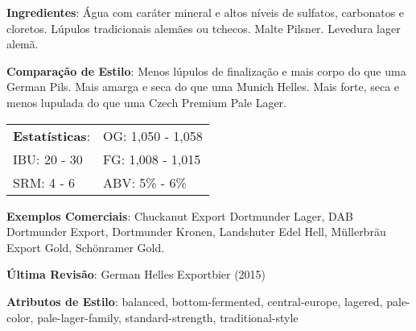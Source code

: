 \textbf{Ingredientes}: Água com caráter mineral e altos níveis de sulfatos, carbonatos e cloretos. Lúpulos tradicionais alemães ou tchecos. Malte Pilsner. Levedura lager alemã.

\textbf{Comparação de Estilo}: Menos lúpulos de finalização e mais corpo do que uma German Pils. Mais amarga e seca do que uma Munich Helles. Mais forte, seca e menos lupulada do que uma Czech Premium Pale Lager.

\begin{tabular}{@{}p{35mm}p{35mm}@{}}
  \textbf{Estatísticas}: & OG: 1,050 - 1,058 \\
  IBU: 20 - 30  & FG: 1,008 - 1,015  \\
  SRM: 4 - 6  & ABV: 5\% - 6\%
\end{tabular}

\textbf{Exemplos Comerciais}: Chuckanut Export Dortmunder Lager, DAB Dortmunder Export, Dortmunder Kronen, Landshuter Edel Hell, Müllerbräu Export Gold, Schönramer Gold.

\textbf{Última Revisão}: German Helles Exportbier (2015)

\textbf{Atributos de Estilo}: balanced, bottom-fermented, central-europe, lagered, pale-color, pale-lager-family, standard-strength, traditional-style
